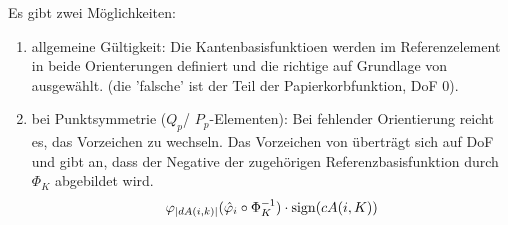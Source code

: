 Es gibt zwei Möglichkeiten:
\begin{enumerate}
\item allgemeine Gültigkeit: Die Kantenbasisfunktioen werden im Referenzelement in beide Orienterungen definiert und die richtige auf Grundlage von  ausgewählt. (die 'falsche' ist der Teil der Papierkorbfunktion, DoF 0).
\item bei Punktsymmetrie ($Q_p$/ $P_p$-Elementen): Bei fehlender Orientierung reicht es, das Vorzeichen zu wechseln. Das Vorzeichen von  überträgt sich auf DoF und gibt an, dass der Negative der zugehörigen Referenzbasisfunktion durch $\Phi_K$ abgebildet wird. 
  \begin{align*}
    \varphi_{ \left|dA(i, k)\right|} (\hat {\varphi}_i \circ \Phi_K^{-1}) \cdot \operatorname{sign}(cA(i, K))
  \end{align*}
\end{enumerate}
